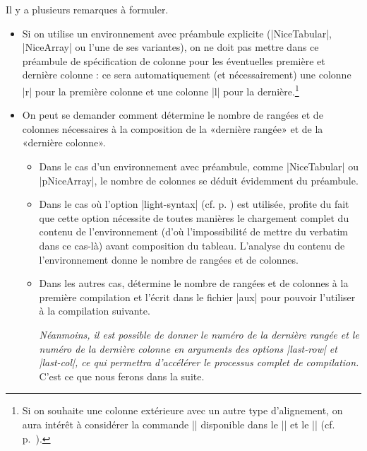 \documentclass[dvipsnames]{article}%
\begin{document}
\medskip
Il y a plusieurs remarques à formuler.
%
\begin{itemize}[beginpenalty=10000]
\item Si on utilise un environnement avec préambule explicite (|{NiceTabular}|,
|{NiceArray}| ou l'une de ses variantes), on ne doit pas mettre dans ce
préambule de spécification de colonne pour les éventuelles première et dernière
colonne : ce sera automatiquement (et nécessairement) une colonne |r| pour la
première colonne et une colonne |l| pour la dernière.\footnote{Si on souhaite
  une colonne extérieure avec un autre type d'alignement, on aura intérêt à
  considérer la commande |\SubMatrix| disponible dans le |\CodeAfter| et le
  |\CodeBefore| (cf. p.~\pageref{sub-matrix}).}

\item On peut se demander comment  détermine le nombre de
rangées et de colonnes nécessaires à la composition de la «dernière rangée» et
de la «dernière colonne».

\begin{itemize}
\item Dans le cas d'un environnement avec préambule, comme |{NiceTabular}| ou
|{pNiceArray}|, le nombre de colonnes se déduit évidemment du préambule.

\item Dans le cas où l'option |light-syntax| (cf. p. \pageref{light-syntax}) est
utilisée,  profite du fait que cette option nécessite de toutes
manières le chargement complet du contenu de l'environnement (d'où
l'impossibilité de mettre du verbatim dans ce cas-là) avant composition du
tableau. L'analyse du contenu de l'environnement donne le nombre de rangées
et de colonnes.

\item Dans les autres cas,  détermine le nombre de rangées et de
colonnes à la première compilation et l'écrit dans le fichier |aux| pour
pouvoir l'utiliser à la compilation suivante.

\textsl{Néanmoins, il est possible de donner le numéro de la dernière rangée et
  le numéro de la dernière colonne en arguments des options |last-row| et
  |last-col|, ce qui permettra d'accélérer le processus complet de compilation.}
C'est ce que nous ferons dans la suite.
\end{itemize}

\end{itemize}

\medskip
{}
\end{document}
